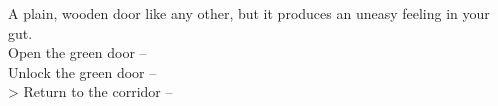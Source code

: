 A plain, wooden door like any other, but it produces an uneasy feeling in your gut.\\

 Open the green door -- \\
 Unlock the green door -- \\
> Return to the corridor -- 